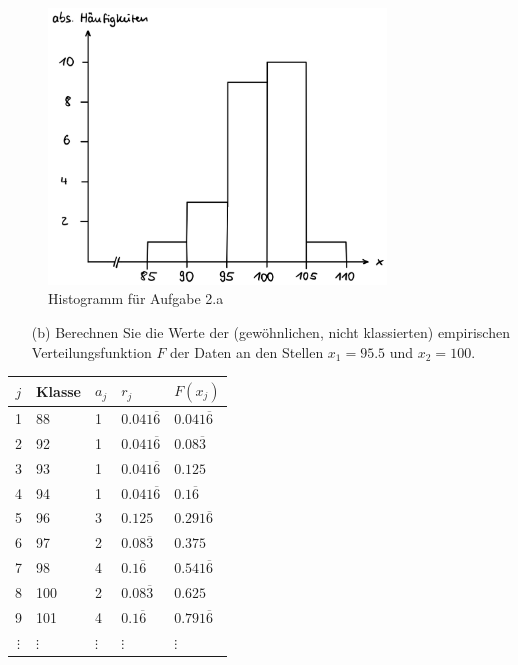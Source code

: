 \begin{figure}[H]
    \centering
    \includegraphics[width=0.8\textwidth]{assets/task2_histogramm.jpeg}
    \caption{Histogramm für Aufgabe 2.a}
\end{figure}


\begin{task}
    \begin{enumerate}
        \item[(b)] Berechnen Sie die Werte der (gewöhnlichen, nicht klassierten) empirischen Verteilungsfunktion $F$ der Daten an den Stellen $x_1=95.5$ und $x_2=100$.
    \end{enumerate}
\end{task}


\begin{table}[H]
\centering
\begin{tabular}{c|llll}
     $j$      & Klasse   & $a_j$     & $r_j$               & $F(x_j)$ \\ \hline
     1        & 88       & 1         & $0.041\overline{6}$ & $0.041\overline{6}$ \\
     2        & 92       & 1         & $0.041\overline{6}$ & $0.08\overline{3}$  \\
     3        & 93       & 1         & $0.041\overline{6}$ & $0.125$             \\
     4        & 94       & 1         & $0.041\overline{6}$ & $0.1\overline{6}$   \\
     5        & 96       & 3         & $0.125$             & $0.291\overline{6}$ \\
     6        & 97       & 2         & $0.08\overline{3}$  & $0.375$             \\
     7        & 98       & 4         & $0.1\overline{6}$   & $0.541\overline{6}$ \\
     8        & 100      & 2         & $0.08\overline{3}$  & $0.625$             \\
     9        & 101      & 4         & $0.1\overline{6}$   & $0.791\overline{6}$ \\
     $\vdots$ & $\vdots$ & $\vdots$  & $\vdots$            & $\vdots$
\end{tabular}
\end{table}

